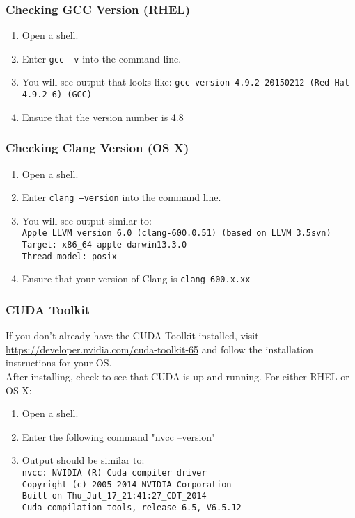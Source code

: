 \documentclass[12pt]{article}
\begin{document}
\subsubsection{Checking GCC Version (RHEL)}
\begin{enumerate}
\item Open a shell.
\item Enter \texttt{gcc -v} into the command line.
\item You will see output that looks like:
\texttt{gcc version 4.9.2 20150212 (Red Hat 4.9.2-6) (GCC)}
\item Ensure that the version number is 4.8
\end{enumerate}

\subsubsection{Checking Clang Version (OS X)}
\begin{enumerate}
\item Open a shell.
\item Enter \texttt{clang --version} into the command line.
\item You will see output similar to: \\
\texttt{Apple LLVM version 6.0 (clang-600.0.51) (based on LLVM 3.5svn)}\\
\texttt{Target: x86\_64-apple-darwin13.3.0}\\
\texttt{Thread model: posix}
\item Ensure that your version of Clang is \texttt{clang-600.x.xx}
\end{enumerate}

\subsubsection{CUDA Toolkit}
If you don't already have the CUDA Toolkit installed, visit \url{https://developer.nvidia.com/cuda-toolkit-65} and follow the installation instructions for your OS.\\

After installing, check to see that CUDA is up and running. For either RHEL or OS X:
\begin{enumerate}
\item Open a shell.
\item Enter the following command "nvcc --version"
\item Output should be similar to:\\
\texttt{nvcc: NVIDIA (R) Cuda compiler driver}\\
\texttt{Copyright (c) 2005-2014 NVIDIA Corporation}\\
\texttt{Built on Thu\_Jul\_17\_21:41:27\_CDT\_2014}\\
\texttt{Cuda compilation tools, release 6.5, V6.5.12}\\
\end{enumerate}
\end{document}
